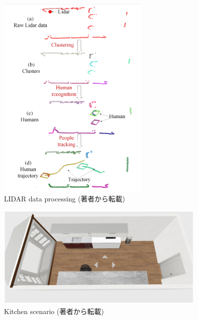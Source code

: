 \begin{figure}[t]
  \begin{center}
  \includegraphics[height=100mm,clip]{figure/2-2_LIDAR-data-processing.png}
  \caption{LIDAR data processing (著者\cite{Temporal convolutional networks for multi-person activity recognition using a 2D LIDAR}から転載)}
  \label{2-2_LIDAR data processing}
  \end{center}
\end{figure}

\begin{figure}[t]
  \begin{center}
  \includegraphics[height=50mm,clip]{figure/2-2_Kitchen-scenario.png}
  \caption{Kitchen scenario (著者\cite{Temporal convolutional networks for multi-person activity recognition using a 2D LIDAR}から転載)}
  \label{2-2_Kitchen scenario}
  \end{center}
\end{figure}

